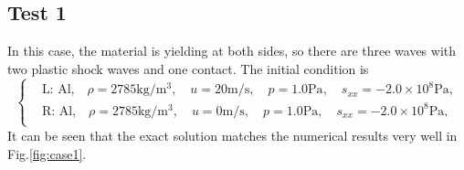 \documentclass{article}
\numberwithin{equation}{section}
\numberwithin{table}{section}
\begin{document}
\subsection{Test 1}
In this case, the material is yielding at both sides, so there are three waves with two plastic shock waves and one contact.
The initial condition is
\begin{equation}
 \left\{ \begin{aligned}
&	 \text{L: Al,}\quad  \rho = 2785 \text{kg}/\text{m}^3, \quad  u = 20\text{m}/\text{s}, \quad  p = 1.0\text{Pa}, \quad  s_{xx}=-2.0\times 10^8 \text{Pa},\\
&	 \text{R: Al,}\quad  \rho = 2785 \text{kg}/\text{m}^3, \quad  u = 0\text{m}/\text{s}, \quad  p = 1.0\text{Pa}, \quad  s_{xx}=-2.0\times 10^8 \text{Pa},\\
   \end{aligned}
 \right.
\end{equation}
It can be seen that the exact solution matches the numerical results very well in Fig.\ref{fig:case1}.
\end{document}
